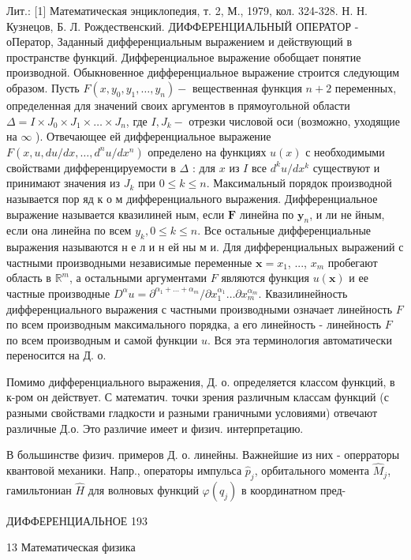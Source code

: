 \documentclass[10pt]{article}
\begin{document}
Лит.: [1] Математическая энциклопедия, т. 2, М., 1979, кол. 324-328. Н. Н. Кузнецов, Б. Л. Рождественский. ДИФФЕРЕНЦИАЛЬНЫЙ ОПЕРАТОР - оПератор, Заданный дифференциальным выражением и действующий в пространстве функций. Дифференциальное выражение обобщает понятие производной. Обыкновенное дифференциальное выражение строится следующим образом. Пусть $F\left(x, y_{0}, y_{1}, \ldots, y_{n}\right)-$ вещественная функция $n+2$ переменных, определенная для значений своих аргументов в прямоугольной области $\Delta=I \times J_{0} \times J_{1} \times \ldots \times J_{n}$, где $I, J_{k}-$ отрезки числовой оси (возможно, уходящие на $\infty$ ). Отвечающее ей дифференциальное выражение $F\left(x, u, d u / d x, \ldots, d^{n} u / d x^{n}\right)$ определено на функциях $u(x)$ с необходимыми свойствами дифференцируемости в $\Delta$ : для $x$ из $I$ все $d^{k} u / d x^{k}$ существуют и принимают значения из $J_{k}$ при $0 \leqslant k \leqslant n$. Максимальный порядок производной называется пор яд к о м дифференциального выражения. Дифференциальное выражение называется квазилиней ным, если $\boldsymbol{F}$ линейна по $\boldsymbol{y}_{n}$, и ли не йным, если она линейна по всем $y_{k}, 0 \leqslant k \leqslant n$. Все остальные дифференциальные выражения называются н е л и н ей ны м и. Для дифференциальных выражений с частными производными независимые переменные $\boldsymbol{x}=x_{1}$, ..., $x_{m}$ пробегают область в $\mathbb{R}^{m}$, а остальными аргументами $F$ являются функция $u(\boldsymbol{x})$ и ее частные производные $D^{\alpha} u=\partial^{\alpha_{1}+\ldots+\alpha_{m}} / \partial x_{1}^{\alpha_{1}} \ldots \partial x_{m}^{\alpha_{m}}$. Квазилинейность дифференциального выражения с частными производными означает линейность $F$ по всем производным максимального порядка, а его линейность - линейность $F$ по всем производным и самой функции $u$. Вся эта терминология автоматически переносится на Д. о.



Помимо дифференциального выражения, Д. о. определяется классом функций, в к-ром он действует. С математич. точки зрения различным классам функций (с разными свойствами гладкости и разными граничными условиями) отвечают различные Д.о. Это различие имеет и физич. интерпретацию.



В большинстве физич. примеров Д. о. линейны. Важнейшие из них - оперраторы квантовой механики. Напр., операторы импульса $\hat{p}_{j}$, орбитального момента $\hat{M}_{j}$, гамильтониан $\hat{H}$ для волновых функций $\varphi\left(q_{j}\right)$ в координатном пред-



ДИФФЕРЕНЦИАЛЬНОЕ 193



13 Математическая физика
\end{document}
